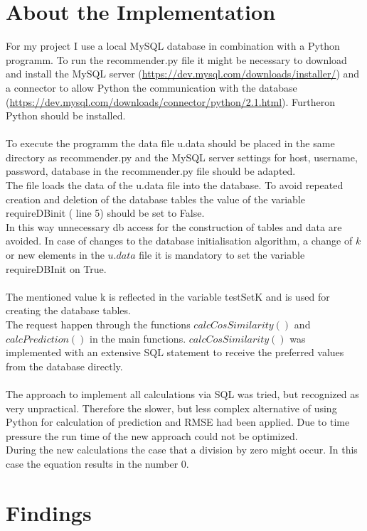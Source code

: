 \documentclass[a4paper,12pt,twoside]{article}
\begin{document}
\section{About the Implementation}
For my project I use a local MySQL database in combination with a Python programm. To run the recommender.py file it might be necessary to download and install the MySQL server (\url{https://dev.mysql.com/downloads/installer/}) and a connector to allow Python the communication with the database (\url{https://dev.mysql.com/downloads/connector/python/2.1.html}). Furtheron Python should be installed.\\
\\
To execute the programm the data file u.data should be placed in the same directory as recommender.py and the MySQL server settings for host, username, password, database in the recommender.py file should be adapted.\\
The file loads the data of the u.data file into the database. To avoid repeated creation and deletion of the database tables the value of the variable requireDBinit ( line 5) should be set to False. \\
In this way unnecessary db access for the construction of tables and data are avoided. In case of changes to the database initialisation algorithm, a change of $k$ or new elements in the $u.data$ file it is mandatory to set the variable requireDBInit on True.\\
\\
The mentioned value k is reflected in the variable testSetK and is used for creating the database tables.\\
The request happen through the functions $calcCosSimilarity()$ and $calcPrediction()$ in the main functions. $calcCosSimilarity()$ was implemented with an extensive SQL statement to receive the preferred values from the database directly. \\
\\
The approach to implement all calculations via SQL was tried, but recognized as very unpractical. Therefore the slower, but less complex alternative of using Python for calculation of prediction and RMSE had been applied. Due to time pressure the run time of the new approach could not be optimized. \\
During the new calculations the case that a division by zero might occur. In this case the equation results in the number 0. \\


\section{Findings}
\end{document}
